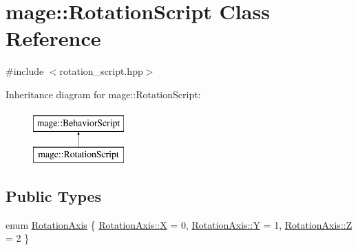 \hypertarget{classmage_1_1_rotation_script}{}\section{mage\+:\+:Rotation\+Script Class Reference}
\label{classmage_1_1_rotation_script}


{\ttfamily \#include $<$rotation\+\_\+script.\+hpp$>$}

Inheritance diagram for mage\+:\+:Rotation\+Script\+:\begin{figure}[H]
\begin{center}
\leavevmode
\includegraphics[height=2.000000cm]{classmage_1_1_rotation_script}
\end{center}
\end{figure}
\subsection*{Public Types}
\begin{DoxyCompactItemize}
\item 
enum \hyperlink{classmage_1_1_rotation_script_ad06cf896ce6dfe4f6676b263d15b4ee9}{Rotation\+Axis} \{ \hyperlink{classmage_1_1_rotation_script_ad06cf896ce6dfe4f6676b263d15b4ee9a02129bb861061d1a052c592e2dc6b383}{Rotation\+Axis\+::X} = 0, 
\hyperlink{classmage_1_1_rotation_script_ad06cf896ce6dfe4f6676b263d15b4ee9a57cec4137b614c87cb4e24a3d003a3e0}{Rotation\+Axis\+::Y} = 1, 
\hyperlink{classmage_1_1_rotation_script_ad06cf896ce6dfe4f6676b263d15b4ee9a21c2e59531c8710156d34a3c30ac81d5}{Rotation\+Axis\+::Z} = 2
 \}
\end{DoxyCompactItemize}
